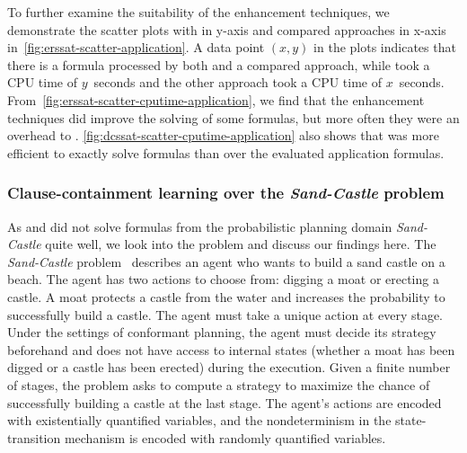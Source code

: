 To further examine the suitability of the enhancement techniques,
we demonstrate the scatter plots with \erssat in y-axis and compared approaches in x-axis
in~\cref{fig:erssat-scatter-application}.
A data point $(x,y)$ in the plots indicates that there is a formula processed by both \erssat and a compared approach,
while \erssat took a CPU time of $y$~seconds and the other approach took a CPU time of $x$~seconds.
From~\cref{fig:erssat-scatter-cputime-application},
we find that the enhancement techniques did improve the solving of some formulas,
but more often they were an overhead to \erssatb.
\cref{fig:dcssat-scatter-cputime-application} also shows that
\dcssat was more efficient to exactly solve formulas than \erssat over the evaluated application formulas.

\subsubsection{Clause-containment learning over the \textit{Sand-Castle} problem}
As \erssat and \erssatb did not solve formulas from the probabilistic planning domain \textit{Sand-Castle} quite well,
we look into the problem and discuss our findings here.
The \textit{Sand-Castle} problem~\cite{Majercik1998} describes an agent who wants to build a sand castle on a beach.
The agent has two actions to choose from: digging a moat or erecting a castle.
A moat protects a castle from the water and increases the probability to successfully build a castle.
The agent must take a unique action at every stage.
Under the settings of conformant planning,
the agent must decide its strategy beforehand and does not have access to internal states
(whether a moat has been digged or a castle has been erected) during the execution.
Given a finite number of stages,
the problem asks to compute a strategy to maximize the chance of successfully building a castle at the last stage.
The agent's actions are encoded with existentially quantified variables,
and the nondeterminism in the state-transition mechanism is encoded with randomly quantified variables.


